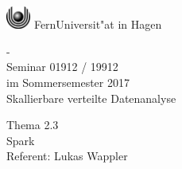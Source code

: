 \documentclass[a4paper,12pt,oneside]{scrbook}
\begin{document}
\thispagestyle{empty}




\begin{center}
\begin{huge}
\vspace*{3cm}
   \begin{minipage}{\textwidth}
     \vspace*{\fill}
    \begin{center}
       \includegraphics[width=0.8cm]{./logo/logo.eps} FernUniversit"at in Hagen
    \end{center}
     \vfill
   \end{minipage}
   -\\
   Seminar 01912 / 19912 \\
   im Sommersemester 2017 \\[2em]
   \glqq{}Skallierbare verteilte Datenanalyse\grqq{} \\[2cm]
\end{huge}
\begin{large}
   Thema 2.3\\[1em]
   Spark\\[3cm]
   Referent: Lukas Wappler
\end{large}

\end{center}


\newpage
\tableofcontents 


 
 
 
 
 
 
\end{document}
